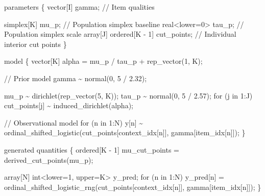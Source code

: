 \documentclass[
  letterpaper,
  DIV=11,
  numbers=noendperiod]{scrartcl}
\newenvironment{Shaded}{\begin{snugshade}}{\end{snugshade}}
\newcommand{\CommentTok}[1]{\textcolor[rgb]{0.37,0.37,0.37}{#1}}
\newcommand{\ControlFlowTok}[1]{\textcolor[rgb]{0.00,0.23,0.31}{#1}}
\newcommand{\DataTypeTok}[1]{\textcolor[rgb]{0.68,0.00,0.00}{#1}}
\newcommand{\DecValTok}[1]{\textcolor[rgb]{0.68,0.00,0.00}{#1}}
\newcommand{\FloatTok}[1]{\textcolor[rgb]{0.68,0.00,0.00}{#1}}
\newcommand{\KeywordTok}[1]{\textcolor[rgb]{0.00,0.23,0.31}{#1}}
\newcommand{\NormalTok}[1]{\textcolor[rgb]{0.00,0.23,0.31}{#1}}
\begin{document}
\begin{codelisting}
\begin{Shaded}
\begin{Highlighting}[]
\KeywordTok{parameters}\NormalTok{ \{}
  \DataTypeTok{vector}\NormalTok{[I] gamma; }\CommentTok{// Item qualities}

  \DataTypeTok{simplex}\NormalTok{[K] mu\_p;                    }\CommentTok{// Population simplex baseline}
  \DataTypeTok{real}\NormalTok{\textless{}}\KeywordTok{lower}\NormalTok{=}\DecValTok{0}\NormalTok{\textgreater{} tau\_p;                }\CommentTok{// Population simplex scale}
  \DataTypeTok{array}\NormalTok{[J] }\DataTypeTok{ordered}\NormalTok{[K {-} }\DecValTok{1}\NormalTok{] cut\_points; }\CommentTok{// Individual interior cut points}
\NormalTok{\}}

\KeywordTok{model}\NormalTok{ \{}
  \DataTypeTok{vector}\NormalTok{[K] alpha = mu\_p / tau\_p + rep\_vector(}\DecValTok{1}\NormalTok{, K);}

  \CommentTok{// Prior model}
\NormalTok{  gamma \textasciitilde{} normal(}\DecValTok{0}\NormalTok{, }\DecValTok{5}\NormalTok{ / }\FloatTok{2.32}\NormalTok{);}

\NormalTok{  mu\_p \textasciitilde{} dirichlet(rep\_vector(}\DecValTok{5}\NormalTok{, K));}
\NormalTok{  tau\_p \textasciitilde{} normal(}\DecValTok{0}\NormalTok{, }\DecValTok{5}\NormalTok{ / }\FloatTok{2.57}\NormalTok{);}
  \ControlFlowTok{for}\NormalTok{ (j }\ControlFlowTok{in} \DecValTok{1}\NormalTok{:J)}
\NormalTok{    cut\_points[j] \textasciitilde{} induced\_dirichlet(alpha);}

  \CommentTok{// Observational model}
  \ControlFlowTok{for}\NormalTok{ (n }\ControlFlowTok{in} \DecValTok{1}\NormalTok{:N)}
\NormalTok{    y[n] \textasciitilde{} ordinal\_shifted\_logistic(cut\_points[context\_idx[n]],}
\NormalTok{                                    gamma[item\_idx[n]]);}
\NormalTok{\}}

\KeywordTok{generated quantities}\NormalTok{ \{}
  \DataTypeTok{ordered}\NormalTok{[K {-} }\DecValTok{1}\NormalTok{] mu\_cut\_points = derived\_cut\_points(mu\_p);}

  \DataTypeTok{array}\NormalTok{[N] }\DataTypeTok{int}\NormalTok{\textless{}}\KeywordTok{lower}\NormalTok{=}\DecValTok{1}\NormalTok{, }\KeywordTok{upper}\NormalTok{=K\textgreater{} y\_pred;}
  \ControlFlowTok{for}\NormalTok{ (n }\ControlFlowTok{in} \DecValTok{1}\NormalTok{:N)}
\NormalTok{    y\_pred[n] = ordinal\_shifted\_logistic\_rng(cut\_points[context\_idx[n]],}
\NormalTok{                                             gamma[item\_idx[n]]);}
\NormalTok{\}}
\end{Highlighting}
\end{Shaded}

\end{codelisting}
\end{document}
